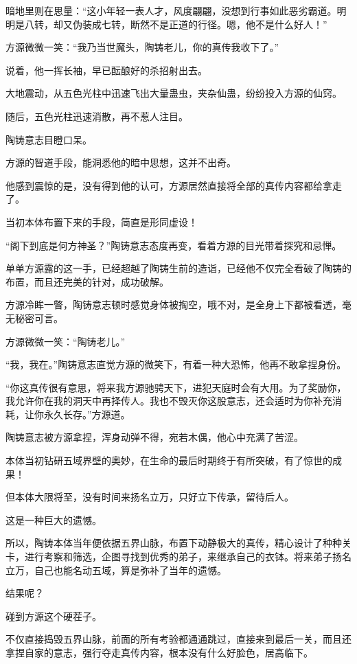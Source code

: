 \begin{this_body}
暗地里则在思量：“这小年轻一表人才，风度翩翩，没想到行事如此恶劣霸道。明明是八转，却又伪装成七转，断然不是正道的行径。嗯，他不是什么好人！”

方源微微一笑：“我乃当世魔头，陶铸老儿，你的真传我收下了。”

说着，他一挥长袖，早已酝酿好的杀招射出去。

大地震动，从五色光柱中迅速飞出大量蛊虫，夹杂仙蛊，纷纷投入方源的仙窍。

随后，五色光柱迅速消散，再不惹人注目。

陶铸意志目瞪口呆。

方源的智道手段，能洞悉他的暗中思想，这并不出奇。

他感到震惊的是，没有得到他的认可，方源居然直接将全部的真传内容都给拿走了。

当初本体布置下来的手段，简直是形同虚设！

“阁下到底是何方神圣？”陶铸意志态度再变，看着方源的目光带着探究和忌惮。

单单方源露的这一手，已经超越了陶铸生前的造诣，已经他不仅完全看破了陶铸的布置，而且还完美的针对，成功破解。

方源冷眸一瞥，陶铸意志顿时感觉身体被掏空，哦不对，是全身上下都被看透，毫无秘密可言。

方源微微一笑：“陶铸老儿。”

“我，我在。”陶铸意志直觉方源的微笑下，有着一种大恐怖，他再不敢拿捏身份。

“你这真传很有意思，将来我方源驰骋天下，进犯天庭时会有大用。为了奖励你，我允许你在我的洞天中再择传人。我也不毁灭你这股意志，还会适时为你补充消耗，让你永久长存。”方源道。

陶铸意志被方源拿捏，浑身动弹不得，宛若木偶，他心中充满了苦涩。

本体当初钻研五域界壁的奥妙，在生命的最后时期终于有所突破，有了惊世的成果！

但本体大限将至，没有时间来扬名立万，只好立下传承，留待后人。

这是一种巨大的遗憾。

所以，陶铸本体当年便依据五界山脉，布置下动静极大的真传，精心设计了种种关卡，进行考察和筛选，企图寻找到优秀的弟子，来继承自己的衣钵。将来弟子扬名立万，自己也能名动五域，算是弥补了当年的遗憾。

结果呢？

碰到方源这个硬茬子。

不仅直接捣毁五界山脉，前面的所有考验都通通跳过，直接来到最后一关，而且还拿捏自家的意志，强行夺走真传内容，根本没有什么好脸色，居高临下。


\end{this_body}
